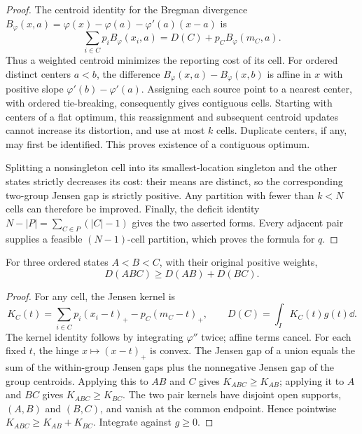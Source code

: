 \begin{proof}
The centroid identity for the Bregman divergence
$B_\varphi(x,a)=\varphi(x)-\varphi(a)-\varphi'(a)(x-a)$ is
\[
 \sum_{i\in C}p_iB_\varphi(x_i,a)
 =D(C)+p_CB_\varphi(m_C,a).
\]
Thus a weighted centroid minimizes the reporting cost of its cell. For
ordered distinct centers $a<b$, the difference
$B_\varphi(x,a)-B_\varphi(x,b)$ is affine in $x$ with positive slope
$\varphi'(b)-\varphi'(a)$. Assigning each source point to a nearest center,
with ordered tie-breaking, consequently gives contiguous cells. Starting
with centers of a flat optimum, this reassignment and subsequent centroid
updates cannot increase its distortion, and use at most $k$ cells.
Duplicate centers, if any, may first be identified. This proves existence
of a contiguous optimum.

Splitting a nonsingleton cell into its smallest-location singleton and
the other states strictly decreases its cost: their means are distinct,
so the corresponding two-group Jensen gap is strictly positive. Any
partition with fewer than $k<N$ cells can therefore be improved. Finally,
the deficit identity
$N-|P|=\sum_{C\in P}(|C|-1)$ gives the two asserted forms. Every adjacent
pair supplies a feasible $(N-1)$-cell partition, which proves the formula
for $q$.
\end{proof}

\begin{lemma}
\label{lem:triple}
For three ordered states $A<B<C$, with their original positive weights,
\[
 D(ABC)\ge D(AB)+D(BC).
\]
\end{lemma}

\begin{proof}
For any cell, the Jensen kernel is
\[
 K_C(t)=\sum_{i\in C}p_i(x_i-t)_+-p_C(m_C-t)_+,
 \qquad D(C)=\int_I K_C(t)g(t)\dd.
\]
The kernel identity follows by integrating $\varphi''$ twice; affine
terms cancel. For each fixed $t$, the hinge $x\mapsto(x-t)_+$ is convex.
The Jensen gap of a union equals the sum of the within-group Jensen gaps
plus the nonnegative Jensen gap of the group centroids. Applying this to
$AB$ and $C$ gives $K_{ABC}\ge K_{AB}$; applying it to $A$ and $BC$ gives
$K_{ABC}\ge K_{BC}$. The two pair kernels have disjoint open supports,
$(A,B)$ and $(B,C)$, and vanish at the common endpoint. Hence pointwise
$K_{ABC}\ge K_{AB}+K_{BC}$. Integrate against $g\ge0$.
\end{proof}


